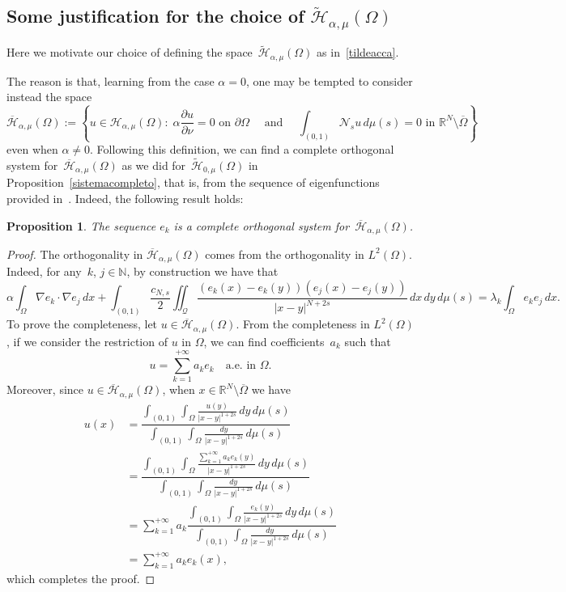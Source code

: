 \documentclass[12pt,a4paper,intlimits,sumlimits]{amsart}
\def \N {\mathbb{N}}
\def \R {\mathbb{R}}
\def \Ns {\mathscr{N}_{s}}
\def \Q {\mathcal Q}
\theoremstyle{definition}
\theoremstyle{plain}
\newtheorem{proposition}[definition]{Proposition}
\numberwithin{equation}{section}
\begin{document}
\begin{appendix}
\section{Some justification for the choice of $\widetilde{\mathcal H}_{\alpha, \mu}(\Omega)$}
\label{sec-app}

Here we motivate our choice of defining the space~$\widetilde{\mathcal H}_{\alpha, \mu}(\Omega)$ as in~\eqref{tildeacca}. 

The reason is that, learning from the case $\alpha=0$, one may be tempted to consider instead the space
\[
\overline{\mathcal H}_{\alpha, \mu}(\Omega)
:=\left\{u\in\mathcal H_{\alpha, \mu}(\Omega) : \;\alpha\dfrac{\partial u}{\partial\nu}=0
\mbox{ on } \partial\Omega
 \quad\mbox{ and }\quad \int_{(0, 1)}\Ns u\, d\mu(s)=0
\mbox{ in }\R^N\setminus \overline{\Omega} \right\}
\]
even when $\alpha\neq 0$.
Following this definition, we can find a  complete orthogonal system 
for~$\overline{\mathcal H}_{\alpha, \mu}(\Omega)$ as we did for~$\widetilde{\mathcal H}_{0, \mu}(\Omega)$ in
Proposition~\ref{sistemacompleto}, that is,
from the sequence of eigenfunctions provided in~\cite[Theorem~1.5]{TUTTI}.  Indeed, the following result holds:

\begin{proposition}
The sequence $e_k$ is a complete orthogonal system for~$\overline{\mathcal H}_{\alpha, \mu}(\Omega)$.
\end{proposition}

\begin{proof}
The orthogonality in $\overline{\mathcal H}_{\alpha, \mu}(\Omega)$
comes from the orthogonality in $L^2(\Omega)$. Indeed,
for any~$k$, $j\in \N$, by construction we have that
\[
\alpha\int_\Omega \nabla e_k\cdot \nabla e_j\,dx
+\int_{(0,1)}\frac{c_{N, s}}{2}\iint_\Q\frac{(e_k(x)-e_k(y))(e_j(x)-e_j(y))}{|x-y|^{N+2s}}\,dx\,dy\,d\mu(s)=\lambda_k \int_\Omega e_k e_j\,dx.
\]
To prove the completeness, let $u\in \overline{\mathcal H}_{\alpha, \mu}(\Omega)$. {F}rom the completeness in $L^2(\Omega)$, if we 
consider the restriction of $u$ in $\Omega$, we can find coefficients~$a_k$ such that
\[
u=\sum_{k=1}^{+\infty}a_ke_k \quad \mbox{a.e. in } \Omega
.\]
Moreover, since $u\in \overline{\mathcal H}_{\alpha, \mu}(\Omega)$,
when $x\in \R^N\setminus \overline{\Omega}$ we have
\[
\begin{aligned}
u(x)&=
\dfrac{\displaystyle \int_{(0,1)}\int_\Omega \frac{u(y)}{|x-y|^{1+2s}}\,dy\,d\mu(s)}{\displaystyle \int_{(0,1)}\int_\Omega \frac{dy}{|x-y|^{1+2s}}\,d\mu(s)} \\
&=\dfrac{\displaystyle \int_{(0,1)}\int_\Omega \frac{\sum_{k=1}^{+\infty}a_ke_k(y)}{|x-y|^{1+2s}}\,dy\,d\mu(s)}{\displaystyle \int_{(0,1)}\int_\Omega \frac{dy}{|x-y|^{1+2s}}\,d\mu(s)} \\
&=\sum_{k=1}^{+\infty}a_k\dfrac{\displaystyle \int_{(0,1)}\int_\Omega \frac{e_k(y)}{|x-y|^{1+2s}}\,dy\,d\mu(s)}{\displaystyle \int_{(0,1)}\int_\Omega \frac{dy}{|x-y|^{1+2s}}\,d\mu(s)} \\
&=\sum_{k=1}^{+\infty}a_k e_k(x),
\end{aligned}          
\]
which completes the proof.
\end{proof}


\end{appendix}
\end{document}
